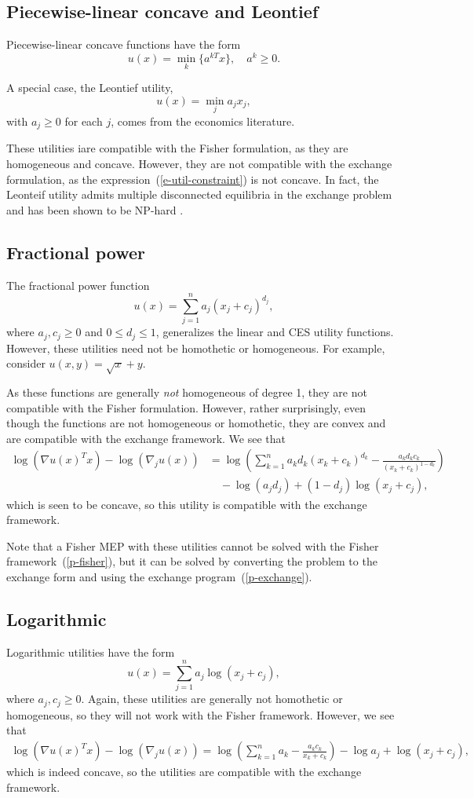 \documentclass[12pt]{article}
\begin{document}
\subsection{Piecewise-linear concave and Leontief}
Piecewise-linear concave functions have the form
\[
u(x) = \min_k\lbrace a^{kT}x \rbrace,\quad a^k \geq 0.
\]

A special case, the Leontief utility,
\[
u(x) = \min_j a_j x_j,
\]
with $a_j \geq 0$ for each $j$,  comes from the economics literature. 

These utilities iare compatible with the Fisher formulation, as they are homogeneous and concave.
However, they are not compatible with the exchange formulation, as the expression~(\ref{e-util-constraint}) is not concave.
In fact, the Leonteif utility admits multiple disconnected equilibria in the exchange problem and has been shown to be NP-hard \cite{codenotti2006leontief}.

\subsection{Fractional power}
The fractional power function
\[
u(x) = \sum_{j=1}^n a_j (x_j+ c_j)^{d_j},
\]
where $a_j, c_j \geq 0$ and $0 \leq d_j \leq 1$,
generalizes the linear and CES utility functions.
However, these utilities need not be homothetic or homogeneous.
For example, consider $u(x,y) = \sqrt{x} + y$.

As these functions are generally \emph{not} homogeneous of degree 1,
they are not compatible with the Fisher formulation.
However, rather surprisingly, even though the
functions are not homogeneous or homothetic, they are
convex and are compatible with the exchange framework.
We see that
\begin{align*}
\log(\nabla u(x)^T x) - \log(\nabla_j u(x))
&= \log\left(\sum_{k=1}^n a_k d_k (x_k+c_k)^{d_k} - \frac{a_k d_k c_k}{(x_k + c_k)^{1-d_k}} \right)\\
&\quad- \log(a_j d_j) + (1-d_j)\log (x_j + c_j),
\end{align*}
which is seen to be concave, so this utility is compatible with
the exchange framework.

Note that a Fisher MEP with these utilities cannot
be solved with the Fisher framework~(\ref{p-fisher}),
but it can be solved by converting the
problem to the exchange form and using the exchange program~(\ref{p-exchange}).


\subsection{Logarithmic}
Logarithmic utilities have the form
\[
u(x) = \sum_{j=1}^n a_j \log(x_j+ c_j),
\]
where $a_j, c_j \geq 0$.
Again, these utilities are generally not homothetic or
homogeneous, so they will not work with the Fisher framework.
However, we see that 
\begin{align*}
\log(\nabla u(x)^T x) - \log(\nabla_j u(x)) =
\log\left(\sum_{k=1}^n a_k - \frac{a_k c_k}{x_k+c_k} \right) - \log a_j + \log (x_j + c_j),
\end{align*}
which is indeed concave, so the utilities are compatible
with the exchange framework.
\end{document}
